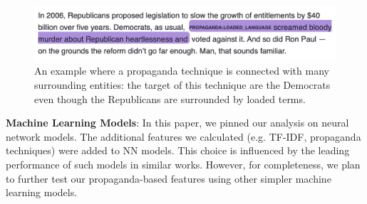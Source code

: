 \begin{figure}[!tb]
    \centering
    \includegraphics[width=\linewidth]{figures/propaganda_example_2.png}
    \vspace{-20px}
    \caption{An example where a propaganda technique is connected with many surrounding entities: the target of this technique are the Democrats even though the Republicans are surrounded by loaded terms.}
    \vspace{-8px}
    \label{fig:propaganda_example_2}
\end{figure}


\noindent\textbf{Machine Learning Models}: In this paper, we pinned our analysis on neural network models. The additional features we calculated (e.g. TF-IDF, propaganda techniques) were added to NN models. This choice is influenced by the leading performance of such models in similar works. However, for completeness, we plan  to further test our propaganda-based features using other simpler machine learning models. %





